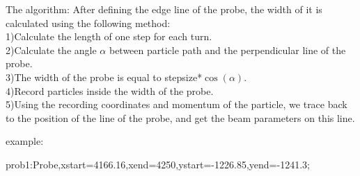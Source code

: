 \documentclass{article}
\begin{document}


The algorithm:
After defining the edge line of the probe, the width of it is calculated using the following method:\\
1)Calculate the length of one step for each turn.\\
2)Calculate the angle $\alpha$ between particle path and the perpendicular line of the probe. \\
3)The width of the probe is equal to stepsize*$\cos(\alpha)$. \\
4)Record particles inside the width of the probe.\\
5)Using the recording coordinates and momentum of the particle, we trace back to the position of the line of the probe, and get the beam
parameters on this line.

example:

prob1:Probe,xstart=4166.16,xend=4250,ystart=-1226.85,yend=-1241.3;
\end{document}
